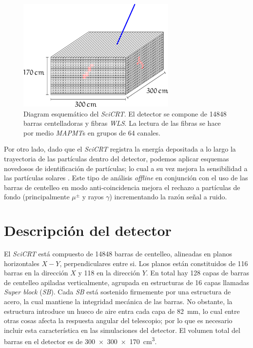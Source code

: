 \begin{figure}
        \centering
        \includegraphics[width=0.7\textwidth]{scibar-diagram.pdf}
        \caption{Diagram esquemático del \emph{SciCRT}. El detector se compone de \num{14848} barras centelladoras y fibras \emph{WLS}. La lectura de las fibras se hace por medio \emph{MAPMT}s en grupos de \num{64} canales.}
        \label{fig:scibar-detector}
\end{figure}

Por otro lado, dado que el \emph{SciCRT} registra la energía depositada a lo largo la trayectoria de las partículas dentro del detector, podemos aplicar esquemas novedosos de identificación de partículas; lo cual a su vez mejora la sensibilidad a las partículas solares \cite{garcia20}. Este tipo de análisis \emph{offline} en conjunción con el uso de las barras de centelleo en modo anti-coincidencia mejora el rechazo a partículas de fondo (principalmente $\mu^{\pm}$ y rayos $\gamma$) incrementando la razón señal a ruido.

\section{Descripción del detector}

El \emph{SciCRT} está compuesto de \num{14848} barras de centelleo, alineadas en planos horizontales $X-Y$, perpendiculares entre si. Los planos están constituidos de \num{116} barras en la dirección $X$ y \num{118} en la dirección $Y$. En total hay \num{128} capas de barras de centelleo apiladas verticalmente, agrupada en estructuras de \num{16} capas llamadas \emph{Super block} (\emph{SB}). Cada \emph{SB} está sostenido firmemente por una estructura de acero, la cual mantiene la integridad mecánica de las barras. No obstante, la estructura introduce un hueco de aire entra cada capa de \SI{82}{\mm}, lo cual entre otras cosas afecta la respuesta angular del telescopio; por lo que es necesario incluir esta característica en las simulaciones del detector. El volumen total del barras en el detector es de \SI[product-units=power]{300x300x170}{\cubic\cm}.


